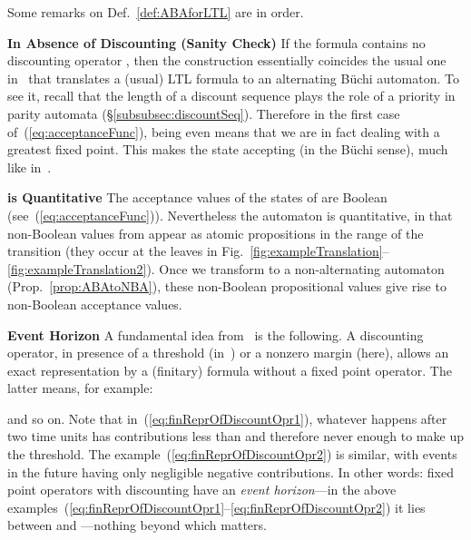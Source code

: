 \documentclass[a4paper,USenglish,numberwithinsect]{lipics}
\theoremstyle{definition}
\theoremstyle{remark}
\theoremstyle{plain}
\begin{document}
Some remarks on Def.~\ref{def:ABAforLTL} are in order.






\noindent
\textbf{In Absence of Discounting (Sanity Check)}\quad 
If the formula  contains no discounting operator ,
then the construction essentially coincides the usual one
in~\cite{Vardi96anautomata-theoretic} that translates a (usual) LTL
formula to an alternating B\"uchi automaton. To see it, 
recall that the length  of a discount sequence plays the
role of a priority in parity automata (\S{}\ref{subsubsec:discountSeq}).
Therefore in the first case of~(\ref{eq:acceptanceFunc}),   being
even means that we are in fact dealing with a greatest fixed point. This
makes the state accepting (in the B\"{u}chi sense), much like in~\cite{Vardi96anautomata-theoretic}.


\noindent 
\textbf{ is Quantitative} \quad
The acceptance values of the states of 
       are Boolean (see~(\ref{eq:acceptanceFunc})). Nevertheless the automaton
       is quantitative, in that non-Boolean values from 
       appear
       as atomic propositions in the range 
       of the transition  (they occur at the leaves in Fig.~\ref{fig:exampleTranslation}--\ref{fig:exampleTranslation2}). Once we transform
        to a
       non-alternating
       automaton (Prop.~\ref{prop:ABAtoNBA}), these non-Boolean
       propositional values
       give rise to non-Boolean acceptance values.

\noindent 
\textbf{Event Horizon} \quad 
A fundamental idea from~\cite{AlmagorBK14} is the following. A discounting operator, in presence of
a threshold (in~\cite{AlmagorBK14}) or a nonzero margin (here), allows an exact
representation by a (finitary) formula without a fixed point
operator. The latter means, for example:

and so on. Note that in~(\ref{eq:finReprOfDiscountOpr1}), whatever happens after two time units
has contributions less than  and
therefore never enough to make up the threshold. The example~(\ref{eq:finReprOfDiscountOpr2})
is similar, with events in the future having only negligible negative
contributions. In other words:  fixed point operators with discounting have
an \emph{event horizon}---in the above examples~(\ref{eq:finReprOfDiscountOpr1}--\ref{eq:finReprOfDiscountOpr2}) it lies between   and
---nothing beyond which  matters.
\end{document}
